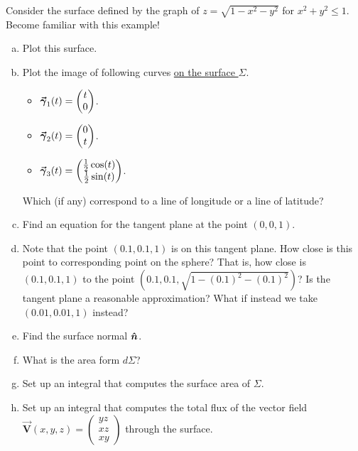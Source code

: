 \documentclass[12pt]{article} %
\newcommand{\vecfieldV}{\boldsymbol{\vec{V}}}
\begin{document}
\begin{problem}
    Consider the surface defined by the graph of $z = \sqrt{1-x^2-y^2}$ for $x^2+y^2\leq 1$. Become familiar with this example!
    \begin{enumerate}[(a)]
        \item Plot this surface.
        \item Plot the image of following curves \underline{on the surface $\Sigma$}. 
        \begin{itemize}
            \item $\boldsymbol{\vec{\gamma}}_1(t) = \begin{pmatrix} t\\ 0 \end{pmatrix}$.
            \item $\boldsymbol{\vec{\gamma}}_2(t) = \begin{pmatrix} 0 \\ t \end{pmatrix}$. 
            \item $\boldsymbol{\vec{\gamma}}_3(t) = \begin{pmatrix} \frac{1}{2} \cos(t) \\ \frac{1}{2} \sin(t) \end{pmatrix}$.
        \end{itemize}
        Which (if any) correspond to a line of longitude or a line of latitude?
        \item Find an equation for the tangent plane at the point $(0,0,1)$.
        \item Note that the point $(0.1,0.1,1)$ is on this tangent plane.  How close is this point to corresponding point on the sphere? That is, how close is $(0.1,0.1,1)$ to the point $(0.1,0.1,\sqrt{1-(0.1)^2-(0.1)^2})$? Is the tangent plane a reasonable approximation? What if instead we take $(0.01,0.01,1)$ instead?
        \item Find the surface normal $\boldsymbol{\hat{n}}$.
        \item What is the area form $d\Sigma$?
        \item Set up an integral that computes the surface area of $\Sigma$.
        \item Set up an integral that computes the total flux of the vector field $\vecfieldV(x,y,z) = \begin{pmatrix} yz \\ xz \\ xy \end{pmatrix}$ through the surface.
    \end{enumerate}
\end{problem}
\end{document}
